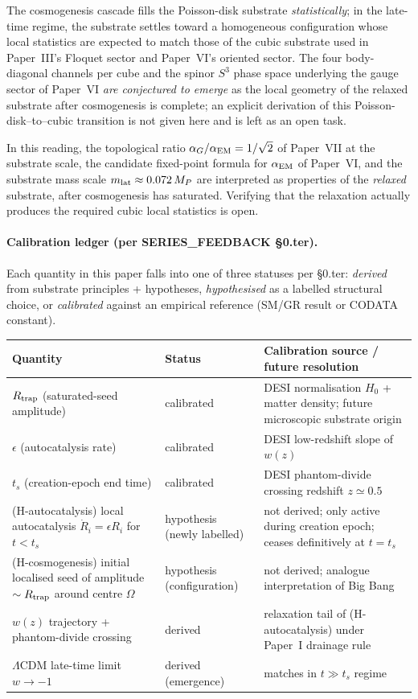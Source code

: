 \documentclass[11pt,a4paper]{article}
\begin{document}
The cosmogenesis cascade fills the Poisson-disk substrate
\emph{statistically}; in the late-time regime, the substrate settles
toward a homogeneous configuration whose local statistics are
expected to match those of the cubic substrate used in Paper~III's
Floquet sector and Paper~VI's oriented sector. The four body-diagonal
channels per cube and the spinor $S^3$ phase space underlying the
gauge sector of Paper~VI \emph{are conjectured to emerge} as the local
geometry of the relaxed substrate after cosmogenesis is complete; an
explicit derivation of this Poisson-disk--to--cubic transition is
not given here and is left as an open task.

In this reading, the topological ratio
$\alpha_G/\alpha_{\rm EM} = 1/\sqrt 2$ of Paper~VII at the substrate
scale, the candidate fixed-point formula for $\alpha_{\rm EM}$ of
Paper~VI, and the substrate mass scale $m_{\rm lat} \approx 0.072\,M_P$
are interpreted as properties of the \emph{relaxed} substrate, after
cosmogenesis has saturated. Verifying that the relaxation actually
produces the required cubic local statistics is open.

\FloatBarrier


\paragraph{Calibration ledger (per SERIES\_FEEDBACK §0.ter).}
Each quantity in this paper falls into one of three statuses
per §0.ter: \emph{derived} from substrate principles +
hypotheses, \emph{hypothesised} as a labelled structural
choice, or \emph{calibrated} against an empirical reference
(SM/GR result or CODATA constant).

\begin{center}
\begin{tabular}{p{3.6cm}p{2.8cm}p{6.8cm}}
\toprule
Quantity & Status & Calibration source / future resolution \\
\midrule
$R_{\rm trap}$ (saturated-seed amplitude) & calibrated & DESI normalisation $H_0$ + matter density; future microscopic substrate origin \\
$\epsilon$ (autocatalysis rate) & calibrated & DESI low-redshift slope of $w(z)$ \\
$t_s$ (creation-epoch end time) & calibrated & DESI phantom-divide crossing redshift $z \simeq 0.5$ \\
(H-autocatalysis) local autocatalysis $\dot R_i = \epsilon R_i$ for $t<t_s$ & hypothesis (newly labelled) & not derived; only active during creation epoch; ceases definitively at $t=t_s$ \\
(H-cosmogenesis) initial localised seed of amplitude $\sim R_{\rm trap}$ around centre $\Omega$ & hypothesis (configuration) & not derived; analogue interpretation of Big Bang \\
$w(z)$ trajectory + phantom-divide crossing & derived & relaxation tail of (H-autocatalysis) under Paper~I drainage rule \\
$\Lambda$CDM late-time limit $w \to -1$ & derived (emergence) & matches in $t \gg t_s$ regime \\
\bottomrule
\end{tabular}
\end{center}
\end{document}
